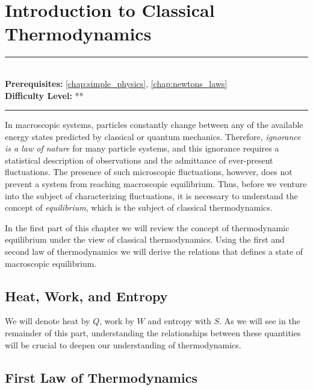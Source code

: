 \documentclass[book.tex]{subfiles}
\begin{document}
\chapter{Introduction to Classical Thermodynamics}

\label{chap:classical_thermo}
\noindent\rule{11cm}{0.4pt} \\
\textbf{Prerequisites:} \autoref{chap:simple_physics}, \autoref{chap:newtons_laws}  \\
\textbf{Difficulty Level:} ** \\
\noindent\rule{11cm}{0.4pt}
\vspace{5mm}

In macroscopic systems, particles constantly change between any of the available energy states predicted by classical or quantum mechanics. Therefore, \textit{ignorance is a law of nature} for many particle systems, and this ignorance requires a statistical description of observations and the admittance of ever-present fluctuations. The presence of such microscopic fluctuations, however, does not prevent a system from reaching macroscopic equilibrium. Thus, before we venture into the subject of characterizing fluctuations, it is necessary to understand the concept of \textit{equilibrium}, which is the subject of classical thermodynamics. 

In the first part of this chapter we will review the concept of thermodynamic equilibrium under the view of classical thermodynamics. Using the first and second law of thermodynamics we will derive the relations that defines a state of macroscopic equilibrium. %

\section{Heat, Work, and Entropy}

We will denote heat by $Q$, work by $W$ and entropy with $S$. As we will see in the remainder of this part, understanding the relationships between these quantities will be crucial to deepen our understanding of thermodynamics.

\section{First Law of Thermodynamics}
\end{document}
